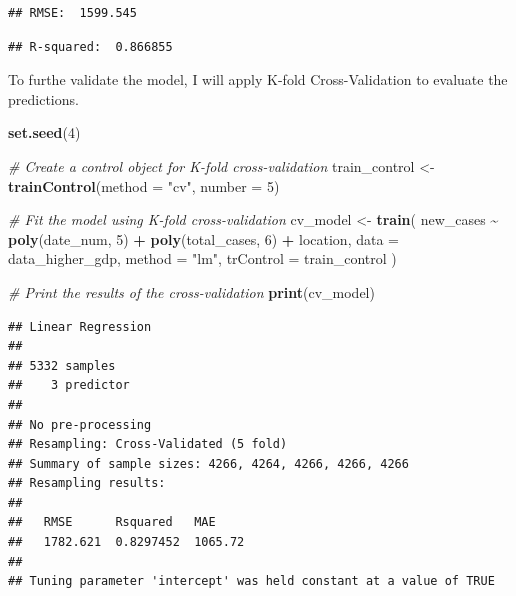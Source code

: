 \documentclass[
]{article}
\newenvironment{Shaded}{\begin{snugshade}}{\end{snugshade}}
\newcommand{\AttributeTok}[1]{\textcolor[rgb]{0.13,0.29,0.53}{#1}}
\newcommand{\CommentTok}[1]{\textcolor[rgb]{0.56,0.35,0.01}{\textit{#1}}}
\newcommand{\DecValTok}[1]{\textcolor[rgb]{0.00,0.00,0.81}{#1}}
\newcommand{\FunctionTok}[1]{\textcolor[rgb]{0.13,0.29,0.53}{\textbf{#1}}}
\newcommand{\NormalTok}[1]{#1}
\newcommand{\OtherTok}[1]{\textcolor[rgb]{0.56,0.35,0.01}{#1}}
\newcommand{\SpecialCharTok}[1]{\textcolor[rgb]{0.81,0.36,0.00}{\textbf{#1}}}
\newcommand{\StringTok}[1]{\textcolor[rgb]{0.31,0.60,0.02}{#1}}
\begin{document}
\begin{verbatim}
## RMSE:  1599.545
\end{verbatim}

\begin{verbatim}
## R-squared:  0.866855
\end{verbatim}

\vspace{1cm}

To furthe validate the model, I will apply K-fold Cross-Validation to
evaluate the predictions.

\begin{Shaded}
\begin{Highlighting}[]
\FunctionTok{set.seed}\NormalTok{(}\DecValTok{4}\NormalTok{)}

\CommentTok{\# Create a control object for K{-}fold cross{-}validation}
\NormalTok{train\_control }\OtherTok{\textless{}{-}} \FunctionTok{trainControl}\NormalTok{(}\AttributeTok{method =} \StringTok{"cv"}\NormalTok{, }\AttributeTok{number =} \DecValTok{5}\NormalTok{)}

\CommentTok{\# Fit the model using K{-}fold cross{-}validation}
\NormalTok{cv\_model }\OtherTok{\textless{}{-}} \FunctionTok{train}\NormalTok{(}
\NormalTok{  new\_cases }\SpecialCharTok{\textasciitilde{}} \FunctionTok{poly}\NormalTok{(date\_num, }\DecValTok{5}\NormalTok{) }\SpecialCharTok{+} \FunctionTok{poly}\NormalTok{(total\_cases, }\DecValTok{6}\NormalTok{) }\SpecialCharTok{+}\NormalTok{ location,}
  \AttributeTok{data =}\NormalTok{ data\_higher\_gdp,}
  \AttributeTok{method =} \StringTok{"lm"}\NormalTok{,}
  \AttributeTok{trControl =}\NormalTok{ train\_control}
\NormalTok{)}

\CommentTok{\# Print the results of the cross{-}validation}
\FunctionTok{print}\NormalTok{(cv\_model)}
\end{Highlighting}
\end{Shaded}

\begin{verbatim}
## Linear Regression 
## 
## 5332 samples
##    3 predictor
## 
## No pre-processing
## Resampling: Cross-Validated (5 fold) 
## Summary of sample sizes: 4266, 4264, 4266, 4266, 4266 
## Resampling results:
## 
##   RMSE      Rsquared   MAE    
##   1782.621  0.8297452  1065.72
## 
## Tuning parameter 'intercept' was held constant at a value of TRUE
\end{verbatim}
\end{document}
